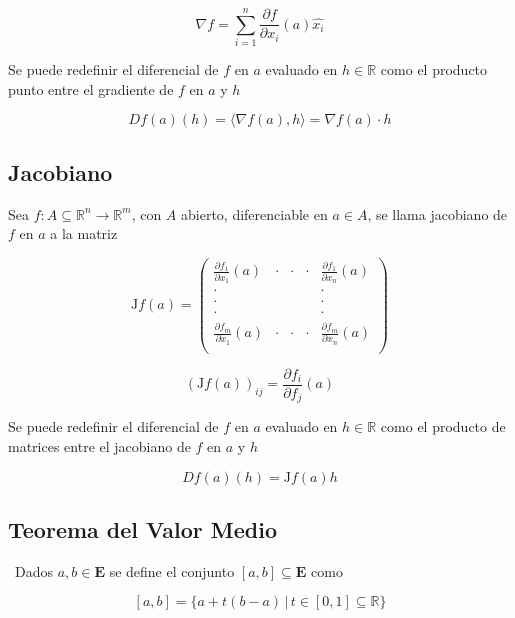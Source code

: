 \[\nabla f = \sum^n_{i=1}\frac{\partial f}{\partial x_i}(a)\hat{x_i}\]

\bigbreak
Se puede redefinir el diferencial de $f$ en $a$ evaluado en $h\in\mathbb{R}$ como el producto punto entre el gradiente de $f$ en $a$ y $h$

\[Df(a)(h) = \langle\nabla f(a), h\rangle = \nabla f(a)\cdot h\]

\subsection{Jacobiano}

Sea $f:A\subseteq\mathbb{R}^n\to\mathbb{R}^m$, con $A$ abierto, diferenciable en $a\in A$, se llama jacobiano de $f$ en $a$ a la matriz

\begin{minipage}{0.55\textwidth}
\begin{equation}
\mathrm{J}f(a) = \begin{pmatrix}
\frac{\partial f_1}{\partial x_1}(a) &\cdot &\cdot &\cdot
& \frac{\partial f_1}{\partial x_n}(a)\\
\cdot & & & & \cdot\\
\cdot & & & & \cdot\\
\cdot & & & & \cdot\\
\frac{\partial f_m}{\partial x_1}(a) &\cdot &\cdot &\cdot
& \frac{\partial f_m}{\partial x_n}(a)\\
\end{pmatrix}
\nonumber
\end{equation}
\end{minipage}
\begin{minipage}{0.55\textwidth}
\begin{equation}
\left(\mathrm{J}f(a)\right)_{ij} = 
\frac{\partial f_i}{\partial f_j}(a)
\nonumber
\end{equation}
\end{minipage}
\bigbreak
Se puede redefinir el diferencial de $f$ en $a$ evaluado en $h\in\mathbb{R}$ como el producto de matrices entre el jacobiano de $f$ en $a$ y $h$

\[Df(a)(h) = \mathrm{J}f(a)h\]

\subsection{Teorema del Valor Medio}
\label{T:ValorMedio}
$\,$\smallbreak
Dados $a,b\in\mathbf{E}$ se define el conjunto $[a,b]\subseteq\mathbf{E}$ como

\[[a, b]=\{a+t(b-a)\,|\,t\in [0,1]\subseteq\mathbb{R}\}\]
\bigbreak

